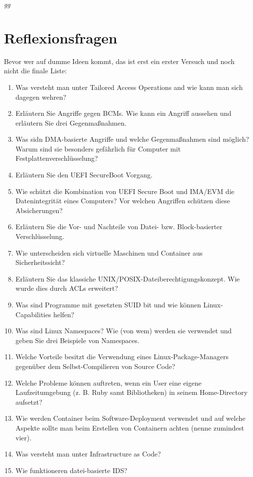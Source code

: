 \documentclass[11pt,fleqn,openany]{book} %
\begin{document}
\textit{gg}

\chapter{Reflexionsfragen}

Bevor wer auf dumme Ideen kommt, das ist erst ein erster Versuch und noch nicht die finale Liste:

\begin{enumerate}
	\item Was versteht man unter Tailored Access Operations and wie kann man sich dagegen wehren?
	\item Erläutern Sie Angriffe gegen BCMs. Wie kann ein Angriff aussehen und erläutern Sie drei Gegenmaßnahmen.
	\item Was sidn DMA-basierte Angriffe und welche Gegenmaßnahmen sind möglich? Warum sind sie besonders gefährlich für Computer mit Festplattenverschlüsselung?
	\item Erläutern Sie den UEFI SecureBoot Vorgang.
	\item Wie schützt die Kombination von UEFI Secure Boot und IMA/EVM die Datenintegrität eines Computers? Vor welchen Angriffen schützen diese Absicherungen?
	\item Erläutern Sie die Vor- und Nachteile von Datei- bzw. Block-basierter Verschlüsselung.
	\item Wie unterscheiden sich virtuelle Maschinen und Container aus Sicherheitssicht?
	\item Erläutern Sie das klassiche UNIX/POSIX-Dateiberechtigungskonzept. Wie wurde dies durch ACLs erweitert?
	\item Was sind Programme mit gesetzten SUID bit und wie können Linux-Capabilities helfen?
	\item Was sind Linux Namespaces? Wie (von wem) werden sie verwendet und geben Sie drei Beispiele von Namespaces.
	\item Welche Vorteile besitzt die Verwendung eines Linux-Package-Managers gegenüber dem Selbst-Compilieren von Source Code?
	\item Welche Probleme können auftreten, wenn ein User eine eigene Laufzeitumgebung (z. B. Ruby samt Bibliotheken) in seinem Home-Directory aufsetzt?
	\item Wie werden Container beim Software-Deployment verwendet und auf welche Aspekte sollte man beim Erstellen von Containern achten (nenne zumindest vier).
	\item Was versteht man unter Infrastructure as Code?
	\item Wie funktioneren datei-basierte IDS?

\end{enumerate}
\end{document}
